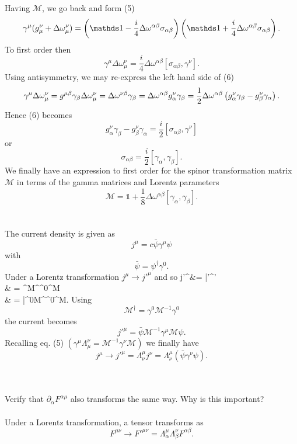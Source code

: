 \documentclass[10pt,letterpaper]{article}
\begin{document}
	Having $\mathcal M$, we go back and form (5) 
	\[
		\gamma^\mu(g^\nu_\mu+\Delta\omega_\mu^\nu) = 
		\plr{\mathds 1 -\frac{i}{4}\Delta\omega^{\alpha\beta}\sigma_{\alpha\beta}}
		\plr{\mathds 1 +\frac{i}{4}\Delta\omega^{\alpha\beta}\sigma_{\alpha\beta}}.
	\]
	To first order then
	\[
		\gamma^\mu\Delta\omega^\nu_\mu = \frac{i}{4}\Delta\omega^{\alpha\beta}[\sigma_{\alpha\beta}
		,\gamma^\nu]\tag{6}.
	\]
	Using antisymmetry, we may re-express the left hand side of (6)
	\[
		\gamma^\mu\Delta\omega_\mu^\nu = g^{\mu\beta}\gamma_\beta\Delta\omega_\mu^\nu
		= \Delta\omega^{\nu\beta} \gamma_\beta = 
		\Delta\omega^{\alpha\beta}g^\nu_\alpha \gamma_\beta = \frac{1}{2}\Delta\omega^{\alpha\beta}
		\left(g_\alpha^\nu \gamma_\beta - g_\beta^\nu \gamma_\alpha\right).
	\]
	Hence (6) becomes
	\[
		g^\nu_\alpha \gamma_\beta - g_\beta^\nu \gamma_\alpha = \frac{i}{2}
		[\sigma_{\alpha\beta},\gamma^\nu]
	\]
	or
	\[
		\sigma_{\alpha\beta} = \frac{i}{2}[\gamma_\alpha,\gamma_\beta]. 
	\]
	We finally have an expression to first order for the spinor transformation matrix $\mathcal M$ 
	in terms of the gamma matrices and Lorentz parameters
	\[
		\mathcal M = \mathds 1 +\frac{1}{8}\Delta\omega^{\alpha\beta}[\gamma_\alpha,
		\gamma_\beta]\tag{7}.
	\]
	\\ \\
	The current density is given as
	\[
		j^\mu = c\bar\psi\gamma^\mu\psi
	\]
	with
	\[
		\bar\psi = \psi^\dag\gamma^0.
	\]
	Under a Lorentz transformation $j^\mu \to j'^\mu$ and so
	\ba
		 j'^\mu &= \bar\psi'\gamma^\mu\psi' \\
		& = \psi^\dag \mathcal M^\dag\gamma^0\gamma^\mu \mathcal M\psi\\
		& = \bar\psi\gamma^0\mathcal M^\dag \gamma^0\gamma^\mu\mathcal M\psi.
	\ea
	Using
	\[
		\mathcal M^\dag = \gamma^0 \mathcal M^{-1}\gamma^0
	\]
	the current becomes 
	\[
		j'^\mu  =  \bar\psi \mathcal M^{-1}\gamma^\mu \mathcal M\psi.
	\]
	Recalling eq. (5) $( \gamma^\mu\Lambda^\nu_\mu = \mathcal M^{-1}\gamma^\nu \mathcal M)$ 
	we finally have
	\[
		j^\mu\to j'^\mu = \Lambda_\nu^\mu j^\nu =  \Lambda^\mu_\nu(\bar\psi \gamma^\nu \psi).
	\]
	\\
	\\
	\item
	Verify that $ \partial_\alpha F^{\alpha\mu}$ also transforms the same way. Why is this important?
	\\
	\\
	Under a Lorentz transformation, a tensor transforms as
	\[
		F^{\mu\nu} \to F'^{\mu\nu} = \Lambda_\alpha^\mu\Lambda_\beta^\nu F^{\alpha\beta}.
	\]
\end{document}
